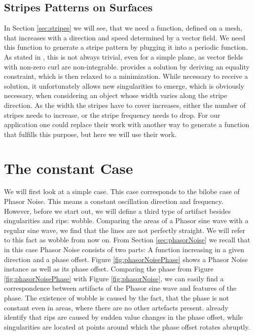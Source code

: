 \documentclass{utue} %
\begin{document}
\subsection{Stripes Patterns on Surfaces}
In Section \ref{sec:stripes} we will see, that we need a function, defined on a mesh, that increases with a direction and speed determined by a vector field. We need this function to generate a stripe pattern by plugging it into a periodic function. As stated in \cite{stripes}, this is not always trivial, even for a simple plane, as vector fields with non-zero curl are non-integrable. \cite{stripes} provides a solution by deriving an equality constraint, which is then relaxed to a minimization. While necessary to receive a solution, it unfortunately allows new singularities to emerge, which is obviously necessary, when considering an object whose width varies along the stripe direction. As the width the stripes have to cover increases, either the number of stripes needs to increase, or the stripe frequency needs to drop. For our application one could replace their work with another way to generate a function that fulfills this purpose, but here we will use their work.

\section{The constant Case}
We will first look at a simple case. This case corresponds to the bilobe case of Phasor Noise. This means a constant oscillation direction and frequency. However, before we start out, we will define a third type of artifact besides singularities and rips: wobble. Comparing the areas of a Phasor sine wave with a regular sine wave, we find that the lines are not perfectly straight. We will refer to this fact as wobble from now on. From Section \ref{sec:phasorNoise} we recall that in this case Phasor Noise consists of two parts: A function increasing in a given direction and a phase offset. Figure \ref{fig:phasorNoisePhase} shows a Phasor Noise instance as well as its phase offset. Comparing the phase from Figure \ref{fig:phasorNoisePhase} with Figure \ref{fig:phasorNoise}, we can easily find a correspondence between artifacts of the Phasor sine wave and features of the phase. The existence of wobble is caused by the fact, that the phase is not constant even in areas, where there are no other artefacts present. \citeauthor{phasorNoise} already identify that rips are caused by sudden value changes in the phase offset, while singularities are located at points around which the phase offset rotates abruptly.\\
\end{document}
